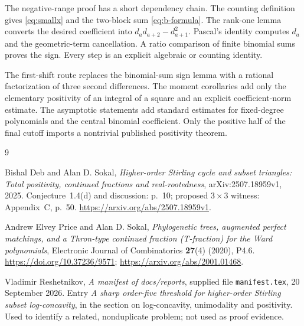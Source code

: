 \documentclass[11pt,a4paper]{article}
\theoremstyle{definition}
\numberwithin{equation}{section}
\begin{document}
The negative-range proof has a short dependency chain. The counting
definition gives \eqref{eq:smallx} and the two-block sum
\eqref{eq:b-formula}. The rank-one lemma converts the desired coefficient
into $d_ad_{a+2}-d_{a+1}^2$. Pascal's identity computes $d_a$ and the
geometric-term cancellation. A ratio comparison of finite binomial
sums proves the sign. Every step is an explicit algebraic or counting
identity.

The first-shift route replaces the binomial-sum sign lemma with a
rational factorization of three second differences. The moment
corollaries add only the elementary positivity of an integral of a
square and an explicit coefficient-norm estimate. The asymptotic
statements add standard estimates for fixed-degree polynomials and the
central binomial coefficient. Only the positive half of the final
cutoff imports a nontrivial published positivity theorem.

\begin{thebibliography}{9}

Bishal Deb and Alan D. Sokal,
\emph{Higher-order Stirling cycle and subset triangles: Total positivity,
continued fractions and real-rootedness},
arXiv:2507.18959v1, 2025.
Conjecture~1.4(d) and discussion: p.~10;
proposed $3\times3$ witness: Appendix~C, p.~50.
\url{https://arxiv.org/abs/2507.18959v1}.

Andrew Elvey Price and Alan D. Sokal,
\emph{Phylogenetic trees, augmented perfect matchings, and a Thron-type
continued fraction (T-fraction) for the Ward polynomials},
Electronic Journal of Combinatorics \textbf{27}(4) (2020), P4.6.
\url{https://doi.org/10.37236/9571};
\url{https://arxiv.org/abs/2001.01468}.

Vladimir Reshetnikov,
\emph{A manifest of docs/reports}, supplied file \texttt{manifest.tex},
20 September 2026.
Entry \emph{A sharp order-five threshold for higher-order Stirling subset
log-concavity}, in the section on log-concavity, unimodality and
positivity. Used to identify a related, nonduplicate problem; not used
as proof evidence.

\end{thebibliography}
\end{document}
